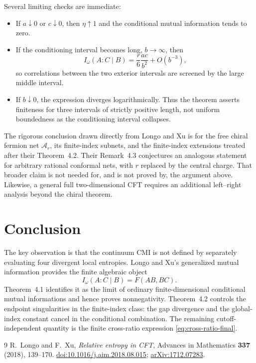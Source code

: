 \documentclass[11pt]{article}
\theoremstyle{accenttheorem}
\theoremstyle{definition}
\newcommand{\Ar}{\mathcal{A}_{r}}
\newcommand{\MI}{F}
\newcommand{\CMI}{I_{\omega}}
\newcommand{\1}{\mathbf{1}}
\begin{document}
Several limiting checks are immediate:
\begin{itemize}
  \item If \(a\downarrow0\) or \(c\downarrow0\), then \(\eta\uparrow1\) and the conditional mutual information tends to zero.
  \item If the conditioning interval becomes long, \(b\to\infty\), then
  \[
    \CMI(A:C\mid B)
    =\frac{r}{6}\frac{ac}{b^2}+O(b^{-3}),
  \]
  so correlations between the two exterior intervals are screened by the large middle interval.
  \item If \(b\downarrow0\), the expression diverges logarithmically.  Thus the theorem asserts finiteness for three intervals of strictly positive length, not uniform boundedness as the conditioning interval collapses.
\end{itemize}

\begin{scopebox}
The rigorous conclusion drawn directly from Longo and Xu is for the free chiral fermion net \(\Ar\), its finite-index subnets, and the finite-index extensions treated after their Theorem~4.2.  Their Remark~4.3 conjectures an analogous statement for arbitrary rational conformal nets, with \(r\) replaced by the central charge.  That broader claim is not needed for, and is not proved by, the argument above.  Likewise, a general full two-dimensional CFT requires an additional left--right analysis beyond the chiral theorem.
\end{scopebox}

\section{Conclusion}

The key observation is that the continuum CMI is not defined by separately evaluating four divergent local entropies.  Longo and Xu's generalized mutual information provides the finite algebraic object
\[
 \CMI(A:C\mid B)=\MI(AB,BC).
\]
Theorem~4.1 identifies it as the limit of ordinary finite-dimensional conditional mutual informations and hence proves nonnegativity.  Theorem~4.2 controls the endpoint singularities in the finite-index class: the gap divergence and the global-index constant cancel in the conditional combination.  The remaining cutoff-independent quantity is the finite cross-ratio expression \eqref{eq:cross-ratio-final}.

\begin{thebibliography}{9}
R.~Longo and F.~Xu,
\emph{Relative entropy in CFT},
Advances in Mathematics \textbf{337} (2018), 139--170.
\href{https://doi.org/10.1016/j.aim.2018.08.015}{doi:10.1016/j.aim.2018.08.015};
\href{https://arxiv.org/abs/1712.07283}{arXiv:1712.07283}.
\end{thebibliography}
\end{document}
